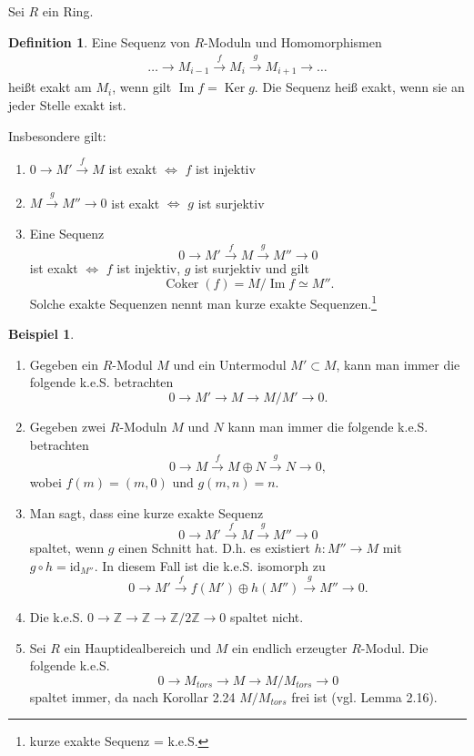 \documentclass[reqno,12pt]{article}
\numberwithin{equation}{section}
\newcommand{\bZ}{\mathbb{Z}}
\newcommand{\iso}{\simeq}
\newcommand{\id}{\text{id}}
\newcommand{\Ker}{\text{Ker }}
\renewcommand{\Im}{\text{Im }}
\theoremstyle{plain}
\theoremstyle{definition}
\newtheorem{definition}[thm]{Definition}
\newtheorem{example}[thm]{Beispiel}
\renewcommand{\Ker}{\operatorname{Ker}}
\renewcommand{\Im}{\operatorname{Im}}
\newcommand{\Coker}{\operatorname{Coker}}
\begin{document}
Sei $R$ ein Ring.

\begin{definition}
Eine Sequenz von $R$-Moduln und Homomorphismen
\begin{align*}
\dots \to M_{i-1} \overset{f}{\to} M_i \overset{g}{\to} M_{i+1} \to \dots
\end{align*}
heißt {\sf exakt am $M_i$}, wenn gilt $\Im f = \Ker g$. Die Sequenz heiß {\sf exakt}, wenn sie an jeder Stelle exakt ist.

Insbesondere gilt:
\begin{enumerate}
  \item $0 \to M' \overset{f}{\to} M$ ist exakt $\iff$  $f$ ist injektiv
  \item $M \overset{g}{\to} M'' \to 0$ ist exakt $\iff$  $g$ ist surjektiv
  \item Eine Sequenz
  $$
  0 \to M' \overset{f}{\to} M \overset{g}{\to} M'' \to 0
  $$
  ist exakt $\iff$  $f$ ist injektiv, $g$ ist surjektiv und gilt
  $$
  \Coker(f)=M/\Im f \iso M''.
  $$
  Solche exakte Sequenzen nennt man {\sf kurze exakte Sequenzen}.\footnote{kurze exakte Sequenz = k.e.S.}
\end{enumerate}
\end{definition}

\begin{example}
\
\begin{enumerate}
\item Gegeben ein $R$-Modul $M$ und ein Untermodul $M' \subset M$, kann man immer die folgende k.e.S. betrachten
$$
0 \to M' \to M  \to M/M' \to 0.
$$
\item Gegeben zwei $R$-Moduln $M$ und $N$ kann man immer die folgende k.e.S. betrachten
$$
0 \to M \overset{f}{\to} M \oplus N \overset{g}{\to} N \to 0,
$$
wobei $f(m) = (m,0)$ und $g(m,n)=n$.

\item Man sagt, dass eine kurze exakte Sequenz
$$
0 \to M' \overset{f}{\to} M \overset{g}{\to} M'' \to 0
$$
{\sf spaltet}, wenn $g$ einen Schnitt hat. D.h. es existiert $h \colon M'' \to M$ mit $g \circ h = \id_{M''}$. In diesem Fall ist die k.e.S. isomorph zu
$$
0 \to M' \overset{f}{\to} f(M') \oplus h(M'') \overset{g}{\to} M'' \to 0.
$$

\item Die k.e.S. $0 \to \bZ \to \bZ \to \bZ / 2 \bZ \to 0$ spaltet nicht.

\item Sei $R$ ein Hauptidealbereich und $M$ ein endlich erzeugter $R$-Modul. Die folgende k.e.S.
$$
0 \to M_{tors} \to M \to M/M_{tors} \to 0
$$
spaltet immer, da nach Korollar 2.24 $M/M_{tors}$ frei ist (vgl. Lemma 2.16).
\end{enumerate}
\end{example}
\end{document}
